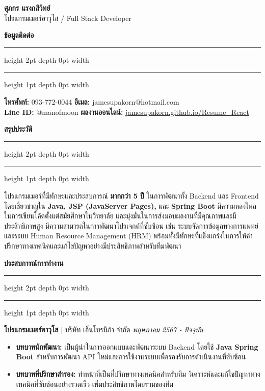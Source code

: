 \documentclass[11pt, a4paper]{article}
\newcommand{\sectiontitle}[1]{
    \vspace{1em}
    {\Large\bfseries\sffamily\color{primaryblue} #1} 
    \vspace{0.3em}
    \hrule height 2pt depth 0pt width \textwidth \color{linecolor}
    \hrule height 1pt depth 0pt width \textwidth
    \vspace{0.7em}
}
\newcommand{\jobentry}[3]{
    \vspace{0.7em} %
    \textbf{\color{black}#1} | #2 \hfill \emph{#3}
}
\begin{document}
\thispagestyle{empty} %

\begin{center}
    {\Huge\bfseries\sffamily ศุภกร แรงกสิวิทย์} \\
    \vspace{0.2em}
    {\Large\sffamily โปรแกรมเมอร์อาวุโส / Full Stack Developer}
\end{center}

\vspace{1em}

\sectiontitle{ข้อมูลติดต่อ}

\begin{flushleft}
    \color{black}
    	\textbf{โทรศัพท์:} 093-772-0044 \hfill \textbf{อีเมล:} jamesupakorn@hotmail.com \\
    \vspace{0.1em} %
    \textbf{Line ID:} @manofmoon \hfill \textbf{ผลงานออนไลน์:} \href{https://jamesupakorn.github.io/Resume_React}{jamesupakorn.github.io/Resume\_React} \\
\end{flushleft}


\sectiontitle{สรุปประวัติ}

\color{black}
โปรแกรมเมอร์ที่มีทักษะและประสบการณ์ \textbf{มากกว่า 5 ปี} ในการพัฒนาทั้ง Backend และ Frontend โดยเชี่ยวชาญใน \textbf{Java, JSP (JavaServer Pages),} และ \textbf{Spring Boot} มีความหลงใหลในการเขียนโค้ดตั้งแต่สมัยศึกษาในวิทยาลัย และมุ่งมั่นในการส่งมอบผลงานที่มีคุณภาพและมีประสิทธิภาพสูง มีความสามารถในการพัฒนาโปรเจกต์ที่ซับซ้อน เช่น ระบบจัดการข้อมูลทางการแพทย์และระบบ Human Resource Management (HRM) พร้อมทั้งมีทักษะที่แข็งแกร่งในการให้คำปรึกษาทางเทคนิคและแก้ไขปัญหาอย่างมีประสิทธิภาพสำหรับทีมพัฒนา

\sectiontitle{ประสบการณ์การทำงาน}
\color{black}

\jobentry{โปรแกรมเมอร์อาวุโส}{บริษัท เอ็นโทรนิก้า จำกัด}{พฤษภาคม 2567 - ปัจจุบัน}
\begin{itemize}
    \item \textbf{บทบาทนักพัฒนา:} เป็นผู้นำในการออกแบบและพัฒนาระบบ Backend โดยใช้ \textbf{Java Spring Boot} สำหรับการพัฒนา API ใหม่และการใช้งานระบบเพื่อรองรับการดำเนินงานที่ซับซ้อน
    \item \textbf{บทบาทที่ปรึกษาสำรอง:} ทำหน้าที่เป็นที่ปรึกษาทางเทคนิคสำหรับทีม วิเคราะห์และแก้ไขปัญหาทางเทคนิคที่ซับซ้อนอย่างรวดเร็ว เพิ่มประสิทธิภาพโดยรวมของทีม
\end{itemize}
\vspace{0.5em} 
\end{document}
